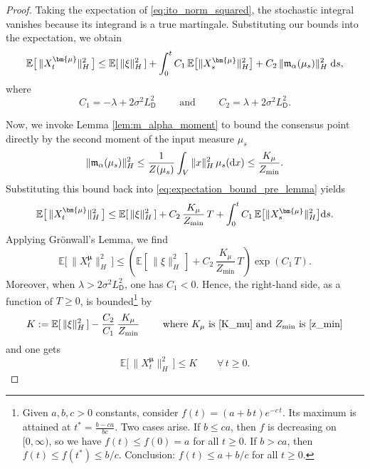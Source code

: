 \documentclass[12pt]{amsart}
\newcommand{\D}[1]{\mbox{\rm #1}}
\newcommand{\dd}{\D{d}}
\numberwithin{equation}{section}
\begin{document}
\begin{proof}
Taking the expectation of \eqref{eq:ito_norm_squared}, the stochastic integral vanishes because its integrand is a true martingale. Substituting our bounds into the expectation, we obtain
\begin{equation}
    \label{eq:expectation_bound_pre_lemma}
    \mathbb{E}\big[\,\|X^{\bm{\mu}}_t\|_H^2\,\big] \leq \mathbb{E}[\,\|\xi\|_H^2\,] + \int_0^t  C_1\, \mathbb{E}\big[\|X^{\bm{\mu}}_s\|_H^2\big] + C_2\, \|\mathfrak{m}_\alpha(\mu_s)\|_H^2  \;\dd s,
\end{equation}
where 
\begin{equation*}
    C_1 = -\lambda + 2\sigma^2 L_{\mathsf{D}}^2 \qquad \text{ and } \qquad C_2 = \lambda + 2\sigma^2 L_{\mathsf{D}}^2.
\end{equation*}

Now, we invoke Lemma \ref{lem:m_alpha_moment} to bound the consensus point directly by the second moment of the input measure $\mu_s$
\begin{equation*}
    \|\mathfrak{m}_\alpha(\mu_s)\|_H^2 \leq \frac{1}{Z(\mu_s)} \int_V \|x\|_H^2 \,\mu_s(\dd x) \leq \frac{K_\mu}{Z_{\min}}.
\end{equation*}
Substituting this bound back into \eqref{eq:expectation_bound_pre_lemma} yields
\begin{equation*}
    \mathbb{E}\big[\,\|X^{\bm{\mu}}_t\|_H^2\,\big] \leq \mathbb{E}[\,\|\xi\|_H^2\,] + C_2 \,\frac{K_\mu}{Z_{\min}} \,T + \int_0^t C_1 \, \mathbb{E}\big[\|X^{\bm{\mu}}_s\|_H^2\big] \dd s.
\end{equation*}
Applying Gr\"onwall's Lemma, we find
\begin{equation}\label{eq:second moment apriori}
    \mathbb{E}\big[\,\|X^{\bm{\mu}}_t\|_H^2\,\big] \leq \left(\mathbb{E}[\,\|\xi\|_H^2\,] + C_2\, \frac{K_\mu}{Z_{\min}}\, T\right) \exp(C_1\, T).
\end{equation}
Moreover, when $\lambda > 2\sigma^2 L_{\mathsf{D}}^2$, one has $C_{1}<0$. Hence, the right-hand side, as a function of $T\geq0$, is bounded\footnote{Given $a,b,c>0$ constants, consider $f(t)=(a+b\,t)e^{-c\,t}$. Its maximum is attained at $t^* = \frac{b-ca}{bc}$. Two cases arise. If $b\leq ca$, then $f$ is decreasing on $[0,\infty)$, so we have $f(t)\leq f(0) =a$ for all $t\geq0$. If $b>ca$, then $f(t)\leq f(t^*)\leq b/c$. Conclusion: $f(t)\leq a+b/c$ for all $t\geq 0$.} by
\[
    K:= \mathbb{E}[\,\|\xi\|_H^2\,] - \frac{C_2}{C_1}\, \frac{K_\mu}{Z_{\min}} \qquad \text{ where } K_\mu \text{ is } \eqref{K_mu} \text{ and } Z_{\min} \text{ is } \eqref{z_min}
\]
and one gets
\begin{equation}\label{eq:second moment apriori 2}
    \mathbb{E}\big[\,\|X^{\bm{\mu}}_t\|_H^2\,\big] \leq K \qquad \forall\,t\geq 0.
\end{equation} 
\end{proof}
\end{document}
